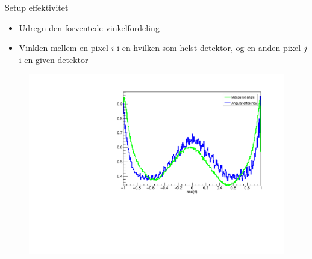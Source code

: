\begin{frame}{Setup effektivitet}
	\begin{itemize}
		\item Udregn den forventede vinkelfordeling
		\item Vinklen mellem en pixel $i$ i en hvilken som helst detektor, og en anden pixel $j$ i en given detektor
	\end{itemize}
	\begin{figure}
		\includegraphics[width=0.7\columnwidth]{../figures/betaAngles/betaAngle.pdf}
	\end{figure}
\end{frame}